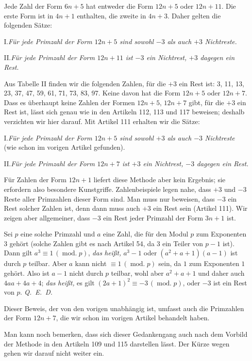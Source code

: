 Jede Zahl der Form $6n+5$ hat entweder die Form $12n+5$ oder $12n+11$. Die erste Form ist in $4n+1$ enthalten, die zweite in $4n+3$. Daher gelten die folgenden Sätze:

I.\quad \emph{Für jede Primzahl der Form $12n+5$ sind sowohl $-3$ als auch $+3$ Nichtreste.}

II.\quad \emph{Für jede Primzahl der Form $12n+11$ ist $-3$ ein Nichtrest, $+3$ dagegen ein Rest.}

Aus Tabelle II finden wir die folgenden Zahlen, für die $+3$ ein Rest ist: 3, 11, 13, 23, 37, 47, 59, 61, 71, 73, 83, 97. Keine davon hat die Form $12n+5$ oder $12n+7$. Dass es überhaupt keine Zahlen der Formen $12n+5$, $12n+7$ gibt, für die $+3$ ein Rest ist, lässt sich genau wie in den Artikeln 112, 113 und 117 beweisen; deshalb verzichten wir hier darauf. Mit Artikel 111 erhalten wir die Sätze:

I.\quad \emph{Für jede Primzahl der Form $12n+5$ sind sowohl $+3$ als auch $-3$ Nichtreste} (wie schon im vorigen Artikel gefunden).

II.\quad \emph{Für jede Primzahl der Form $12n+7$ ist $+3$ ein Nichtrest, $-3$ dagegen ein Rest.}

Für Zahlen der Form $12n+1$ liefert diese Methode aber kein Ergebnis; sie erfordern also besondere Kunstgriffe. Zahlenbeispiele legen nahe, dass $+3$ und $-3$ Reste aller Primzahlen dieser Form sind. Man muss nur beweisen, dass $-3$ ein Rest solcher Zahlen ist, denn dann muss auch $+3$ ein Rest sein (Artikel 111). Wir zeigen aber allgemeiner, dass $-3$ ein Rest jeder Primzahl der Form $3n+1$ ist.

Sei $p$ eine solche Primzahl und $a$ eine Zahl, die für den Modul $p$ zum Exponenten $3$ gehört (solche Zahlen gibt es nach Artikel 54, da $3$ ein Teiler von $p-1$ ist). Dann gilt $a^3\equiv1\,(\operatorname{mod.}p)$, \emph{das heißt,} $a^3-1$ oder $(a^2+a+1)(a-1)$ ist durch $p$ teilbar. Aber $a$ kann nicht $\equiv1\,(\operatorname{mod.}p)$ sein, da $1$ zum Exponenten $1$ gehört. Also ist $a-1$ nicht durch $p$ teilbar, wohl aber $a^2+a+1$ und daher auch $4aa+4a+4$; \emph{das heißt,} es gilt $(2a+1)^2\equiv-3\,(\operatorname{mod.}p)$, oder $-3$ ist ein Rest von $p$. \mbox{\emph{Q. E. D.}}

Dieser Beweis, der von den vorigen unabhängig ist, umfasst auch die Primzahlen der Form $12n+7$, die wir schon im vorigen Artikel behandelt haben.

Man kann noch bemerken, dass sich dieser Gedankengang auch nach dem Vorbild der Methode in den Artikeln 109 und 115 darstellen lässt. Der Kürze wegen gehen wir darauf nicht weiter ein.

